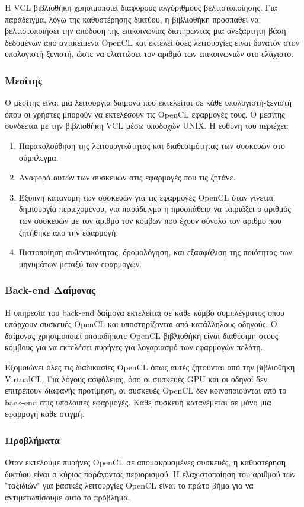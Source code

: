 Η VCL βιβλιοθήκη χρησιμοποιεί διάφορους αλγόριθμους βελτιστοποίησης. Για παράδειγμα, λόγω της καθυστέρησης δικτύου, η βιβλιοθήκη προσπαθεί να βελτιστοποιήσει την απόδοση της επικοινωνίας διατηρώντας μια ανεξάρτητη βάση δεδομένων από αντικείμενα OpenCL και εκτελεί όσες λειτουργίες είναι δυνατόν στον υπολογιστή-ξενιστή, ώστε να ελαττώσει τον αριθμό των επικοινωνιών στο ελάχιστο.\cite{virtualcl-3}
\subsubsection{Μεσίτης}
Ο μεσίτης είναι μια λειτουργία δαίμονα που εκτελείται σε κάθε υπολογιστή-ξενιστή όπου οι χρήστες μπορούν να εκτελέσουν τις OpenCL εφαρμογές τους. Ο μεσίτης συνδέεται με την βιβλιοθήκη VCL μέσω υποδοχών UNIX. Η ευθύνη του περιέχει:
\begin{enumerate}
\item Παρακολούθηση της λειτουργικότητας και διαθεσιμότητας των συσκευών στο σύμπλεγμα.
\item Αναφορά αυτών των συσκευών στις εφαρμογές που τις ζητάνε.
\item Έξυπνη κατανομή των συσκευών για τις εφαρμογές OpenCL όταν γίνεται δημιουργία περιεχομένου, για παράδειγμα η προσπάθεια να ταιριάξει ο αριθμός των συσκευών με τον αριθμό τον κόμβων που έχουν σύνολο τον αριθμό που ζητήθηκε απο την εφαρμογή.
\item Πιστοποίηση αυθεντικότητας, δρομολόγηση, και εξασφάλιση της ποιότητας των μηνυμάτων μεταξύ των εφαρμογών. 
\end{enumerate}

\subsubsection{Back-end Δαίμονας}
Η υπηρεσία του back-end δαίμονα εκτελείται σε κάθε κόμβο συμπλέγματος όπου υπάρχουν συσκευές OpenCL και υποστηρίζονται από κατάλληλους οδηγούς. Ο δαίμονας χρησιμοποιεί οποιαδήποτε OpenCL βιβλιοθήκη είναι διαθέσιμη στους κόμβους για να εκτελέσει πυρήνες για λογαριασμό των εφαρμογών πελάτη.

Εξομοιώνει όλες τις διαδικασίες OpenCL όπως αυτές ζητούνται από την βιβλιοθήκη VirtualCL. Για λόγους ασφάλειας, όσο οι συσκευές GPU και οι οδηγοί δεν επιτρέπουν διαφανής προτίμηση, οι συσκευές OpenCL δεν κοινοποιούνται από το back-end στις υπόλοιπες εφαρμογές. Κάθε συσκευή κατανέμεται σε μόνο μια εφαρμογή κάθε στιγμή.\cite{virtualcl-4}


\subsubsection{Προβλήματα}
Όταν εκτελούμε πυρήνες OpenCL σε απομακρυσμένες συσκευές, η καθυστέρηση δικτύου είναι ο κύριος παράγοντας περιορισμού. Η ελαχιστοποίηση του αριθμού των "ταξιδιών" για βασικές λειτουργίες OpenCL είναι το πρώτο βήμα για να αντιμετωπίσουμε αυτό το πρόβλημα.

